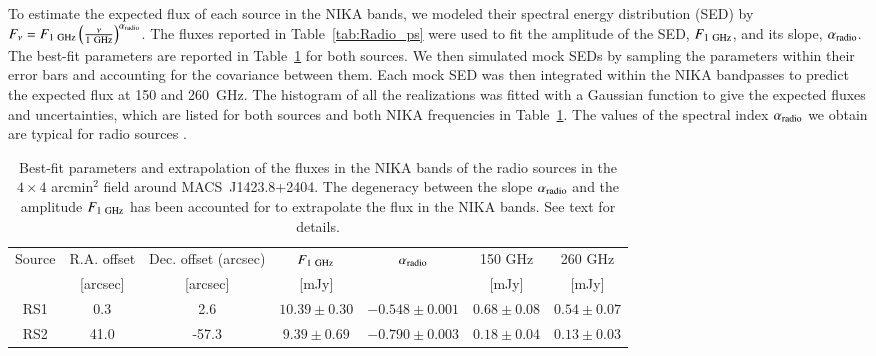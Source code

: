\documentclass[traditabstract]{aa}
\begin{document}
To estimate the expected flux of each source in the NIKA bands, we modeled their spectral energy distribution (SED) by $F_{\nu} = F_{1 \ {\rm GHz}} \left(\frac{\nu}{1 \ {\rm GHz}}\right)^{\alpha_{\rm radio}}$. The fluxes reported in Table~\ref{tab:Radio_ps} were used to fit the amplitude of the SED, $F_{1 \ {\rm GHz}}$, and its slope, $\alpha_{\rm radio}$. The best-fit parameters are reported in Table~\ref{tab:Radio_ps2} for both sources. We then simulated mock SEDs by sampling the parameters within their error bars and accounting for the covariance between them. Each mock SED was then integrated within the NIKA bandpasses to predict the expected flux at 150 and 260~GHz. The histogram of all the realizations was fitted with a Gaussian function to give the expected fluxes and uncertainties, which are listed for both sources and both NIKA frequencies in Table~\ref{tab:Radio_ps2}. The values of the spectral index $\alpha_{\rm radio}$ we obtain are typical for radio sources \citep[see for example][]{witzel1979}.
\begin{table}[h]
\caption{\footnotesize Best-fit parameters and extrapolation of the fluxes in the NIKA bands of the radio sources in the $4 \times 4$ arcmin$^2$ field around \mbox{MACS~J1423.8+2404}. The degeneracy between the slope $\alpha_{\rm radio}$ and the amplitude $F_{1 \ {\rm GHz}}$ has been accounted for to extrapolate the flux in the NIKA bands. See text for details.}
\begin{center}
\begin{tabular}{ccccccc}
\hline
\hline
Source & R.A. offset & Dec. offset (arcsec) & $F_{1 \ {\rm GHz}}$ & $\alpha_{\rm radio}$ & 150 GHz & 260 GHz \\
 & [arcsec] & [arcsec] & [mJy] & & [mJy] & [mJy] \\
\hline
RS1 &      0.3 &      2.6 & $   10.39 \pm     0.30$ & $  -0.548 \pm    0.001$ & $    0.68 \pm     0.08$ & $    0.54 \pm     0.07$ \\
RS2 &     41.0 &    -57.3 & $    9.39 \pm     0.69$ & $  -0.790 \pm    0.003$ & $    0.18 \pm     0.04$ & $    0.13 \pm     0.03$ \\
\hline
\end{tabular}
\end{center}
\label{tab:Radio_ps2}
\end{table}
\end{document}
